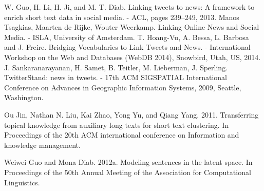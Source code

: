 \documentclass[14pt,a4paper,oneside]{extarticle}
\begin{document}


\clearpage
\begin{thebibliography}{0}
     W. Guo, H. Li, H. Ji, and M. T. Diab. Linking tweets to news: A framework to enrich short text data in social media. - ACL, pages 239–249, 2013.
     Manos Tsagkias, Maarten de Rijke, Wouter Weerkamp. Linking Online News and Social Media. - ISLA, University of Amsterdam.
     T. Hoang-Vu, A. Bessa, L. Barbosa and J. Freire. Bridging Vocabularies to Link Tweets and News. - International Workshop on the Web and Databases (WebDB 2014), Snowbird, Utah, US, 2014.
     J. Sankaranarayanan, H. Samet, B. Teitler, M. Lieberman, J. Sperling. TwitterStand: news in tweets. - 17th ACM SIGSPATIAL International Conference on Advances in Geographic Information Systems, 2009, Seattle, Washington.

     Ou Jin, Nathan N. Liu, Kai Zhao, Yong Yu, and Qiang Yang. 2011. Transferring topical knowledge from auxiliary long texts for short text clustering. In Proceedings of the 20th ACM international conference on Information and knowledge management.

     Weiwei Guo and Mona Diab. 2012a. Modeling sentences in the latent space. In Proceedings of the 50th Annual Meeting of the Association for Computational Linguistics. 

    \hrulefill

\end{thebibliography}
\end{document}
